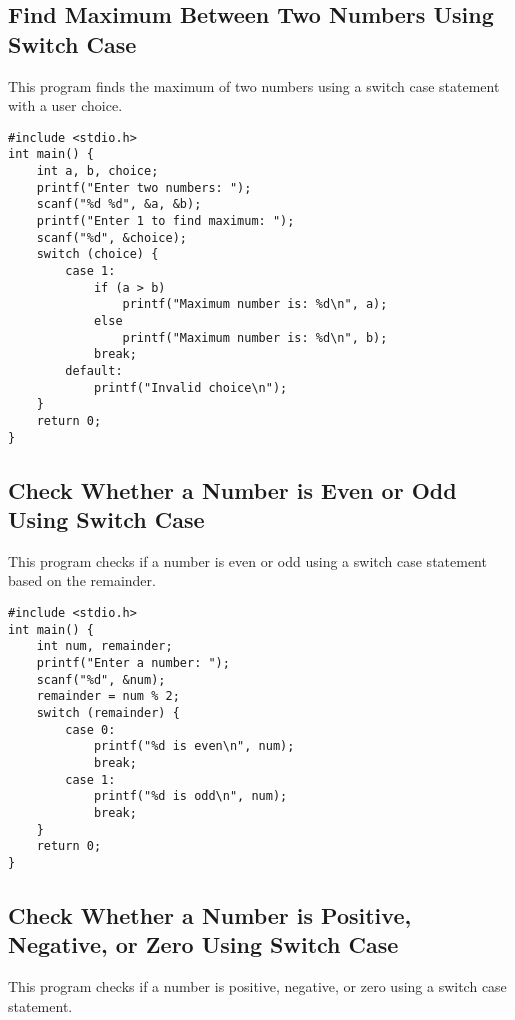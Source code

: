 \documentclass[a4paper,12pt]{article}
\begin{document}
\newpage

\subsection{Find Maximum Between Two Numbers Using Switch Case}
This program finds the maximum of two numbers using a switch case statement with a user choice.

\begin{lstlisting}[caption={Find Maximum Between Two Numbers Using Switch Case}]
#include <stdio.h>
int main() {
    int a, b, choice;
    printf("Enter two numbers: ");
    scanf("%d %d", &a, &b);
    printf("Enter 1 to find maximum: ");
    scanf("%d", &choice);
    switch (choice) {
        case 1:
            if (a > b)
                printf("Maximum number is: %d\n", a);
            else
                printf("Maximum number is: %d\n", b);
            break;
        default:
            printf("Invalid choice\n");
    }
    return 0;
}
\end{lstlisting}

\newpage

\subsection{Check Whether a Number is Even or Odd Using Switch Case}
This program checks if a number is even or odd using a switch case statement based on the remainder.

\begin{lstlisting}[caption={Check Whether a Number is Even or Odd Using Switch Case}]
#include <stdio.h>
int main() {
    int num, remainder;
    printf("Enter a number: ");
    scanf("%d", &num);
    remainder = num % 2;
    switch (remainder) {
        case 0:
            printf("%d is even\n", num);
            break;
        case 1:
            printf("%d is odd\n", num);
            break;
    }
    return 0;
}
\end{lstlisting}

\newpage

\subsection{Check Whether a Number is Positive, Negative, or Zero Using Switch Case}
This program checks if a number is positive, negative, or zero using a switch case statement.
\end{document}
